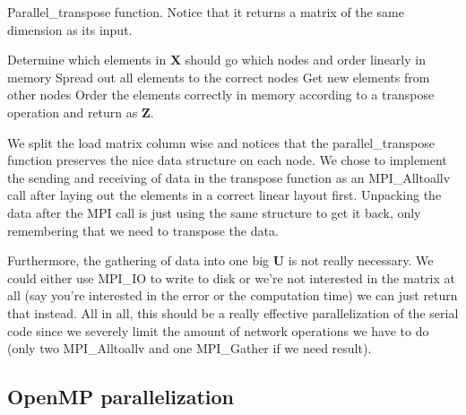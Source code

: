 \begin{algorithm}[H]
 \caption{Parallel\_transpose function. Notice that it returns a matrix of the same dimension as its input.}
 Determine which elements in $\mathbf{X}$ should go which nodes and order linearly in memory \;
 Spread out all elements to the correct nodes \;
 Get new elements from other nodes \;
 Order the elements correctly in memory according to a transpose operation and return as $\mathbf{Z}$.
 \label{code:transpose}
\end{algorithm}
We split the load matrix column wise and notices that the parallel\_transpose function preserves the nice data structure on each node. We chose to implement the sending and receiving of data in the transpose function as an MPI\_Alltoallv call after laying out the elements in a correct linear layout first. Unpacking the data after the MPI call is just using the same structure to get it back, only remembering that we need to transpose the data.

Furthermore, the gathering of data into one big $\mathbf{U}$ is not really necessary. We could either use MPI\_IO to write to disk or we're not interested in the matrix at all (say you're interested in the error or the computation time) we can just return that instead. All in all, this should be a really effective parallelization of the serial code since we severely limit the amount of network operations we have to do (only two MPI\_Alltoallv and one MPI\_Gather if we need result).

\subsection*{OpenMP parallelization}
